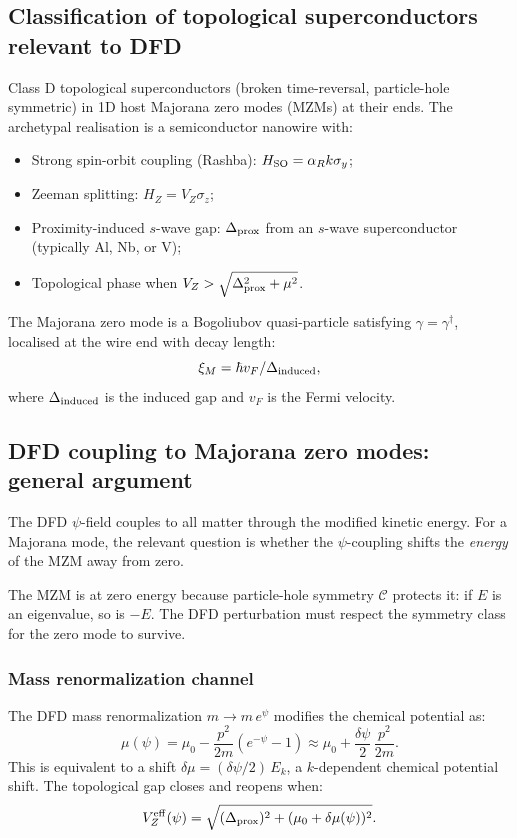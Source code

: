 \documentclass[11pt]{article}
\begin{document}
\subsection{Classification of topological superconductors relevant to DFD}

Class D topological superconductors (broken time-reversal, particle-hole
symmetric) in 1D host Majorana zero modes (MZMs) at their ends. The
archetypal realisation is a semiconductor nanowire with:
\begin{itemize}
  \item Strong spin-orbit coupling (Rashba): $H_{\rm SO} = \alpha_R k\sigma_y$;
  \item Zeeman splitting: $H_Z = V_Z\sigma_z$;
  \item Proximity-induced $s$-wave gap: $\Delta_{\rm prox}$ from an $s$-wave
        superconductor (typically Al, Nb, or V);
  \item Topological phase when $V_Z > \sqrt{\Delta_{\rm prox}^2 + \mu^2}$.
\end{itemize}

The Majorana zero mode is a Bogoliubov quasi-particle satisfying
$\gamma = \gamma^\dagger$, localised at the wire end with decay length:
\begin{equation}
\xi_M = \hbar v_F / \Delta_{\rm induced},
\label{eq:xi-M}
\end{equation}
where $\Delta_{\rm induced}$ is the induced gap and $v_F$ is the Fermi velocity.

\subsection{DFD coupling to Majorana zero modes: general argument}

The DFD $\psi$-field couples to all matter through the modified kinetic
energy. For a Majorana mode, the relevant question is whether the
$\psi$-coupling shifts the \emph{energy} of the MZM away from zero.

The MZM is at zero energy because particle-hole symmetry $\mathcal{C}$
protects it: if $E$ is an eigenvalue, so is $-E$. The DFD perturbation
must respect the symmetry class for the zero mode to survive.

\subsubsection{Mass renormalization channel}

The DFD mass renormalization $m \to m\,e^\psi$ modifies the chemical
potential as:
\begin{equation}
\mu(\psi) = \mu_0 - \frac{p^2}{2m}(e^{-\psi} - 1) \approx \mu_0 + \frac{\delta\psi}{2}\,\frac{p^2}{2m}.
\label{eq:mu-psi}
\end{equation}
This is equivalent to a shift $\delta\mu = (\delta\psi/2)\,E_k$, a $k$-dependent
chemical potential shift. The topological gap closes and reopens when:
\begin{equation}
V_Z^{\rm eff}(\psi) = \sqrt{(\Delta_{\rm prox})^2 + (\mu_0 + \delta\mu(\psi))^2}.
\label{eq:Vz-eff}
\end{equation}
\end{document}
